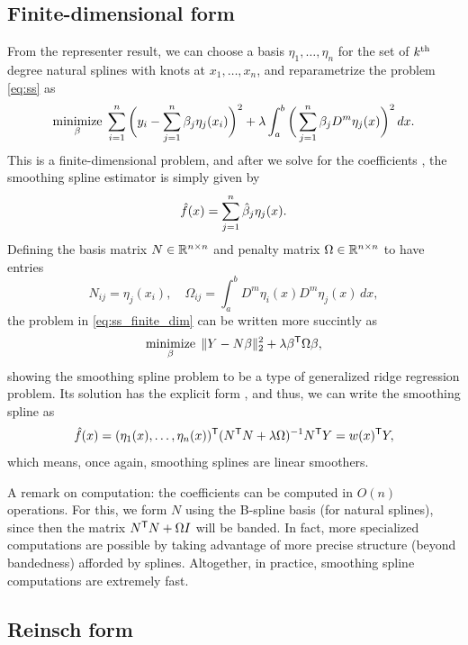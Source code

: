 \documentclass{article}
\begin{document}
\subsection{Finite-dimensional form}

From the representer result, we can choose a basis $\eta_1,\dots,\eta_n$ for the
set of $k^{\text{th}}$ degree natural splines with knots at $x_1,\dots,x_n$, and
reparametrize the problem \eqref{eq:ss} as  
\begin{equation}
\label{eq:ss_finite_dim}
\mathop{\mathrm{minimize}}_\beta \; \sum_{i=1}^n \bigg( y_i - \sum_{j=1}^n \beta_j \eta_j(x_i)
\bigg)^2 + \lambda \int_a^b \bigg( \sum_{j=1}^n \beta_j D^m \eta_j(x) \bigg)^2
\, dx.  
\end{equation}
This is a finite-dimensional problem, and after we solve for the coefficients
, the smoothing spline estimator is simply given by  
\[
\hat{f}(x) = \sum_{j=1}^n \hat{\beta}_j \eta_j(x).
\]
Defining the basis matrix $N \in \mathbb{R}^{n \times n}$ and penalty matrix $\Omega \in
\mathbb{R}^{n \times n}$ to have entries
\[
N_{ij} = \eta_j(x_i), \quad 
\Omega_{ij} = \int_a^b D^m \eta_i(x) D^m \eta_j(x) \, dx,
\]
the problem in \eqref{eq:ss_finite_dim} can be written more succintly as
\[
\mathop{\mathrm{minimize}}_\beta \; \|Y - N\beta\|_2^2 + \lambda \beta^{\mathsf{T}} \Omega \beta,   
\]
showing the smoothing spline problem to be a type of generalized ridge
regression problem. Its solution has the explicit form , and thus, we can write the smoothing spline
as    
\[
\hat{f}(x) = (\eta_1(x),\dots,\eta_n(x))^{\mathsf{T}} (N^{\mathsf{T}} N + \lambda \Omega)^{-1} N^{\mathsf{T}} Y =
w(x)^{\mathsf{T}} Y,   
\]
which means, once again, smoothing splines are linear smoothers.

A remark on computation: the coefficients  can be computed in $O(n)$ operations. For this, we form  
$N$ using the B-spline basis (for natural splines), since then the matrix $N^{\mathsf{T}}
N + \Omega I$ will be banded. In fact, more specialized computations are
possible by taking advantage of more precise structure (beyond bandedness)
afforded by splines. Altogether, in practice, smoothing spline computations are 
extremely fast. 

\subsection{Reinsch form}
\end{document}
